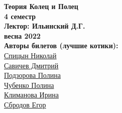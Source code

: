  


    \thispagestyle{empty}
    \BgThispage
    \begin{center}
        \vspace*{4cm}
        
        \Huge
        \textbf{Теория Колец и Полец} \\
        \textbf{4 семестр} \\
        \textbf{Лектор: Ильинский Д.Г.} \\
        \textbf{весна 2022} \\
    
        
        \vspace{7cm}
        \Large
        \textbf{Авторы билетов (лучшие котики):} \\
        \href{https://vk.com/spitsynn}{Спицын Николай} \\
        \href{https://vk.com/dimasav123}{Савичев Дмитрий} \\
        \href{https://vk.com/id165779384}{Подзорова Полина} \\
        \href{https://vk.com/poli.dobro}{Чубенко Полина} \\        
        \href{https://vk.com/meraklim}{Климанова Ирина} \\
        \href{https://vk.com/ulegor}{Сбродов Егор} \\
        
    \end{center}

\newpage

\tableofcontents
\newpage












